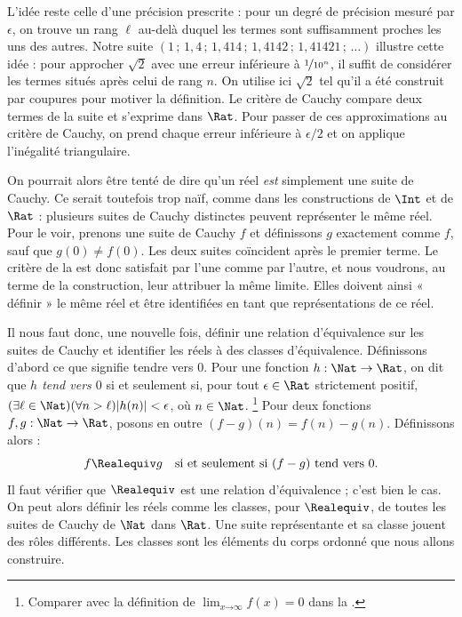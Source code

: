 \documentclass[../../../include/open-logic-section]{subfiles}
\begin{document}
L'idée reste celle d'une précision prescrite : pour un degré de
précision mesuré par $\epsilon$, on trouve un rang $\ell$ au-delà
duquel les termes sont suffisamment proches les uns des autres.
Notre suite $(1\,;\,1{,}4\,;\,1{,}414\,;\,1{,}4142\,;\,1{,}41421\,;\,\ldots)$
illustre cette idée : pour approcher $\sqrt{2}$ avec une erreur
inférieure à $\nicefrac{1}{10^n}$, il suffit de considérer les termes
situés après celui de rang $n$.
On utilise ici $\sqrt{2}$ tel qu'il a été construit par coupures
pour motiver la définition. Le critère de Cauchy compare deux termes
de la suite et s'exprime dans $\Rat$. Pour passer de ces approximations
au critère de Cauchy, on prend chaque erreur inférieure à
$\epsilon/2$ et on applique l'inégalité triangulaire.
%
%
%

On pourrait alors être tenté de dire qu'un réel \emph{est} simplement
une suite de Cauchy. Ce serait toutefois trop naïf, comme dans les
constructions de $\Int$ et de $\Rat$ : plusieurs suites de Cauchy
distinctes peuvent représenter le même réel. Pour le voir, prenons une
suite de Cauchy $f$ et définissons $g$ exactement comme $f$, sauf que
$g(0)\neq f(0)$. Les deux suites coïncident après le premier terme.
Le critère de la  est donc satisfait par l'une
comme par l'autre, et nous voudrons, au terme de la construction, leur
attribuer la même limite. Elles doivent ainsi « définir » le même réel
et être identifiées en tant que représentations de ce réel.

Il nous faut donc, une nouvelle fois, définir une relation d'équivalence
sur les suites de Cauchy et identifier les réels à des classes
d'équivalence. Définissons d'abord ce que signifie tendre vers $0$.
Pour une fonction $h:\Nat\to\Rat$, on dit que \emph{$h$ tend vers $0$}
si et seulement si, pour tout $\epsilon\in\Rat$ strictement positif,
$(\exists\ell\in\Nat)(\forall n>\ell)|h(n)|<\epsilon$, où $n\in\Nat$.
\footnote{Comparer avec la définition de
$\lim_{x\mathord{\rightarrow}\infty}f(x)=0$ dans la
.}
Pour deux fonctions $f,g:\Nat\to\Rat$, posons en outre
$(f-g)(n)=f(n)-g(n)$. Définissons alors :
\[
f\Realequiv g\quad\text{si et seulement si }(f-g)\text{ tend vers }0.
\]
Il faut vérifier que $\Realequiv$ est une relation d'équivalence ;
c'est bien le cas. On peut alors définir les réels comme les classes,
pour $\Realequiv$, de toutes les suites de Cauchy de $\Nat$ dans $\Rat$.
Une suite représentante et sa classe jouent des rôles différents.
Les classes sont les éléments du corps ordonné que nous allons construire.
%
%
%
%
\end{document}
